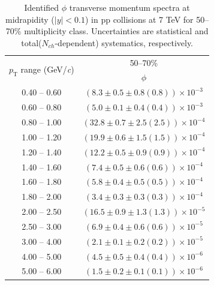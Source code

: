 \begin{table}
\caption{Identified $\phi$ transverse momentum spectra at midrapidity ($|y|<0.1$) in pp collisions at 7 TeV for 50--70\% multiplicity class. Uncertainties are statistical and total($N_{ch}$-dependent) systematics, respectively.}
\label{tab:Phi_50to70}
\begin{center}
\begin{tabular}{ c | c }
\hline
\multirow{2}{*}{$p_{\mathrm{T}}$ range (GeV/\textit{c})} & \multicolumn{1}{c}{50--70\%} \\ & $\phi$\\ 
\hline
0.40 -- 0.60 & $(8.3\pm0.5\pm0.8(0.8))\times10^{-3}$ \\ 
0.60 -- 0.80 & $(5.0\pm0.1\pm0.4(0.4))\times10^{-3}$ \\ 
0.80 -- 1.00 & $(32.8\pm0.7\pm2.5(2.5))\times10^{-4}$ \\ 
1.00 -- 1.20 & $(19.9\pm0.6\pm1.5(1.5))\times10^{-4}$ \\ 
1.20 -- 1.40 & $(12.2\pm0.5\pm0.9(0.9))\times10^{-4}$ \\ 
1.40 -- 1.60 & $(7.4\pm0.5\pm0.6(0.6))\times10^{-4}$ \\ 
1.60 -- 1.80 & $(5.8\pm0.4\pm0.5(0.5))\times10^{-4}$ \\ 
1.80 -- 2.00 & $(3.4\pm0.3\pm0.3(0.3))\times10^{-4}$ \\ 
2.00 -- 2.50 & $(16.5\pm0.9\pm1.3(1.3))\times10^{-5}$ \\ 
2.50 -- 3.00 & $(6.9\pm0.4\pm0.6(0.6))\times10^{-5}$ \\ 
3.00 -- 4.00 & $(2.1\pm0.1\pm0.2(0.2))\times10^{-5}$ \\ 
4.00 -- 5.00 & $(4.5\pm0.5\pm0.4(0.4))\times10^{-6}$ \\ 
5.00 -- 6.00 & $(1.5\pm0.2\pm0.1(0.1))\times10^{-6}$ \\ 
\hline
\end{tabular}
\end{center}
\end{table}
 
